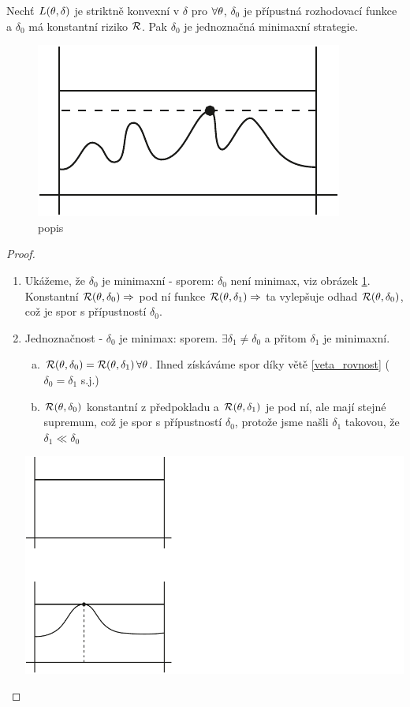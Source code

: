 \begin{theorem}["Obrátka"]
	Nechť $L(\theta,\delta)$ je striktně konvexní v $\delta$ pro $\forall\theta$, $\delta_0$ je přípustná rozhodovací funkce a $\delta_0$ má konstantní riziko $\mathcal{R}$. Pak $\delta_0$ je jednoznačná minimaxní strategie.
	\begin{figure}[h]
		\centering
		\includegraphics[width=0.4\linewidth]{pictures/26_11_3.pdf}
		\caption{popis}
		\label{fig:26-3}
	\end{figure}
	
	\begin{proof}
		\begin{enumerate}[1)]
			\item Ukážeme, že $\delta_0$ je minimaxní - sporem: $\delta_0$ není minimax, viz obrázek \ref{fig:26-3}. Konstantní $\mathcal{R}(\theta,\delta_0)\Rightarrow$ pod ní funkce $\mathcal{R}(\theta,\delta_1)\Rightarrow$ ta vylepšuje odhad $\mathcal{R}(\theta,\delta_0)$, což je spor s přípustností $\delta_0$.
			\item Jednoznačnost - $\delta_0$ je minimax: sporem. $\exists\delta_1\neq\delta_0$ a přitom $\delta_1$ je minimaxní.
			\begin{enumerate}[a)]
			\item $\mathcal{R}(\theta,\delta_0)=\mathcal{R}(\theta,\delta_1)\,\forall\theta$. Ihned získáváme spor díky větě \ref{veta_rovnost} ($\delta_0=\delta_1$ s.j.)
			\item $\mathcal{R}(\theta,\delta_0)$ konstantní z předpokladu a $\mathcal{R}(\theta,\delta_1)$ je pod ní, ale mají stejné supremum, což je spor s přípustností $\delta_0$, protože jsme našli $\delta_1$ takovou, že $\delta_1\ll\delta_0$
			\end{enumerate}
			\begin{center}
				\includegraphics[width=0.7\linewidth]{pictures/26_11_4.pdf}
			\end{center}
		\end{enumerate}
	\end{proof}
\end{theorem}
